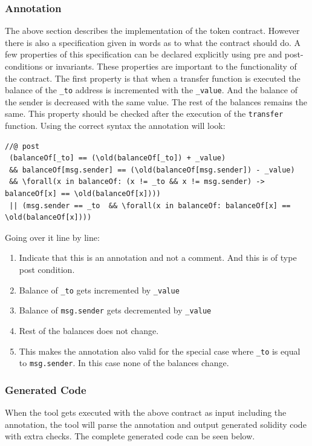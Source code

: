 \documentclass[a4paper]{article}
\begin{document}
\subsubsection{Annotation}
The above section describes the implementation of the token contract. However there is also a specification given in words as to what the contract should do. A few properties of this specification can be declared explicitly using pre and post-conditions or invariants. These properties are important to the functionality of the contract. 
The first property is that when a transfer function is executed the balance of the \texttt{\_to} address is incremented with the \texttt{\_value}. And the balance of the sender is decreased with the same value. The rest of the balances remains the same. This property should be checked after the execution of the \texttt{transfer} function. Using the correct syntax the annotation will look:
\begin{lstlisting}[basicstyle=\ttfamily, breaklines=true ]
//@ post 
 (balanceOf[_to] == (\old(balanceOf[_to]) + _value) 
 && balanceOf[msg.sender] == (\old(balanceOf[msg.sender]) - _value) 
 && \forall(x in balanceOf: (x != _to && x != msg.sender) -> balanceOf[x] == \old(balanceOf[x]))) 
 || (msg.sender == _to  && \forall(x in balanceOf: balanceOf[x] == \old(balanceOf[x])))
\end{lstlisting}
Going over it line by line:
\begin{enumerate}
  \item Indicate that this is an annotation and not a comment. And this is of type post condition.
  \item Balance of \texttt{\_to} gets incremented by \texttt{\_value}
  \item Balance of \texttt{msg.sender} gets decremented by \texttt{\_value}
  \item Rest of the balances does not change.
  \item This makes the annotation also valid for the special case where \texttt{\_to} is equal to \texttt{msg.sender}. In this case none of the balances change.
\end{enumerate}

\subsubsection{Generated Code}
When the tool gets executed with the above contract as input including the annotation, the tool will parse the annotation and output generated solidity code with extra checks. 
The complete generated code can be seen below.

\end{document}
